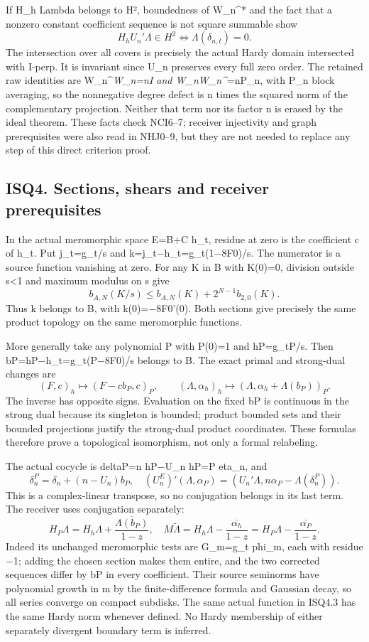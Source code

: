 \documentclass[
]{article}
\begin{document}
If H\_h Lambda belongs to H², boundedness of W\_n\^{}* and the fact that a nonzero constant coefficient sequence is not square summable show \[
H_hU_n'\Lambda\in H^2\iff\Lambda(\delta_{n,t})=0.
\] The intersection over all covers is precisely the actual Hardy domain intersected with I-perp. It is invariant since U\_n preserves every full zero order. The retained raw identities are W\_n\^{}\emph{W\_n=nI and W\_nW\_n\^{}}=nP\_n, with P\_n block averaging, so the nonnegative degree defect is n times the squared norm of the complementary projection. Neither that term nor its factor n is erased by the ideal theorem. These facts check NCI6--7; receiver injectivity and graph prerequisites were also read in NHJ0--9, but they are not needed to replace any step of this direct criterion proof.

\subsection{ISQ4. Sections, shears and receiver prerequisites}\label{isq4.-sections-shears-and-receiver-prerequisites}

In the actual meromorphic space E=B+C h\_t, residue at zero is the coefficient c of h\_t. Put j\_t=g\_t/s and k=j\_t−h\_t=g\_t(1−8F0)/s. The numerator is a source function vanishing at zero. For any K in B with K(0)=0, division outside \textbar s\textbar\textless1 and maximum modulus on \textbar s give \[
b_{A,N}(K/s)\le b_{A,N}(K)+2^{N-1}b_{2,0}(K).
\] Thus k belongs to B, with k(0)=−8F0'(0). Both sections give precisely the same product topology on the same meromorphic functions.

More generally take any polynomial P with P(0)=1 and hP=g\_tP/s. Then bP=hP−h\_t=g\_t(P−8F0)/s belongs to B. The exact primal and strong-dual changes are \[
(F,c)_h\mapsto(F-cb_P,c)_P,
\qquad(\Lambda,\alpha_h)_h\mapsto
(\Lambda,\alpha_h+\Lambda(b_P))_P.
\tag{ISQ4.1}
\] The inverse has opposite signs. Evaluation on the fixed bP is continuous in the strong dual because its singleton is bounded; product bounded sets and their bounded projections justify the strong-dual product coordinates. These formulas therefore prove a topological isomorphism, not only a formal relabeling.

The actual cocycle is deltaP=n hP−U\_n hP=P eta\_n, and \[
\delta^P_n=\delta_n+(n-U_n)b_P,
\quad (U_n^E)'(\Lambda,\alpha_P)
=(U_n'\Lambda,n\alpha_P-\Lambda(\delta^P_n)).
\tag{ISQ4.2}
\] This is a complex-linear transpose, so no conjugation belongs in its last term. The receiver uses conjugation separately: \[
H_P\Lambda=H_h\Lambda+\frac{\overline{\Lambda(b_P)}}{1-z},
\quad M\widetilde\Lambda
=H_h\Lambda-\frac{\overline{\alpha_h}}{1-z}
=H_P\Lambda-\frac{\overline{\alpha_P}}{1-z}.
\tag{ISQ4.3}
\] Indeed its unchanged meromorphic tests are G\_m=g\_t phi\_m, each with residue −1; adding the chosen section makes them entire, and the two corrected sequences differ by bP in every coefficient. Their source seminorms have polynomial growth in m by the finite-difference formula and Gaussian decay, so all series converge on compact subdisks. The same actual function in ISQ4.3 has the same Hardy norm whenever defined. No Hardy membership of either separately divergent boundary term is inferred.
\end{document}
